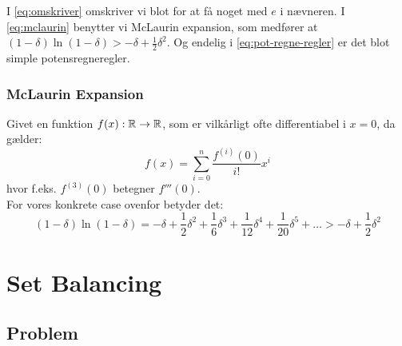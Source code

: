 I \cref{eq:omskriver} omskriver vi blot for at få noget med $e$ i nævneren. I \cref{eq:mclaurin} benytter vi McLaurin expansion, som medfører at $(1 - \delta) \ln(1 - \delta) > - \delta + \frac{1}{2} \delta^2$. Og endelig i \cref{eq:pot-regne-regler} er det blot simple potensregneregler.

\subsubsection{McLaurin Expansion}
Givet en funktion $f(x) : {\mathbb R} \to {\mathbb R}$, som er vilkårligt ofte differentiabel i $x = 0$, da gælder:
$$
f(x) = \sum_{i=0}^n \frac{f^{(i)} (0)}{i!} x^i
$$
hvor f.eks. $f^{(3)} (0)$ betegner $f'''(0)$.\\

For vores konkrete case ovenfor betyder det:
$$
(1 - \delta) \ln(1 - \delta)
= - \delta + \frac{1}{2} \delta^2 + \frac{1}{6} \delta^3 + \frac{1}{12} \delta^4 + \frac{1}{20} \delta^5 + \dots > - \delta + \frac{1}{2} \delta^2
$$






\section{Set Balancing}
\subsection{Problem}

